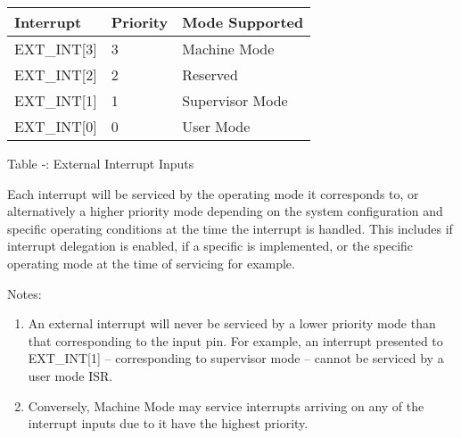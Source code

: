 \begin{longtable}[]{@{}lll@{}}
\toprule
Interrupt & Priority & Mode Supported\tabularnewline
\midrule
\endhead
EXT\_INT{[}3{]} & 3 & Machine Mode\tabularnewline
EXT\_INT{[}2{]} & 2 & Reserved\tabularnewline
EXT\_INT{[}1{]} & 1 & Supervisor Mode\tabularnewline
EXT\_INT{[}0{]} & 0 & User Mode\tabularnewline
\bottomrule
\end{longtable}

\protect\hypertarget{_Ref367447228}{}{}Table ‑: External Interrupt
Inputs

Each interrupt will be serviced by the operating mode it corresponds to,
or alternatively a higher priority mode depending on the system
configuration and specific operating conditions at the time the
interrupt is handled. This includes if interrupt delegation is enabled,
if a specific is implemented, or the specific operating mode at the time
of servicing for example.

Notes:

\begin{enumerate}
\def\labelenumi{\arabic{enumi}.}
\item
  An external interrupt will never be serviced by a lower priority mode
  than that corresponding to the input pin. For example, an interrupt
  presented to EXT\_INT{[}1{]} -- corresponding to supervisor mode --
  cannot be serviced by a user mode ISR.
\item
  Conversely, Machine Mode may service interrupts arriving on any of the
  interrupt inputs due to it have the highest priority.
\end{enumerate}
